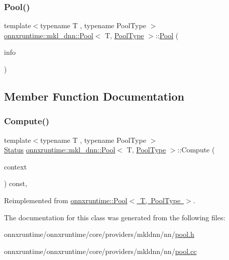 \subsubsection{\texorpdfstring{Pool()}{Pool()}}
{\footnotesize\ttfamily template$<$typename T , typename Pool\+Type $>$ \\
\mbox{\hyperlink{classonnxruntime_1_1mkl__dnn_1_1Pool}{onnxruntime\+::mkl\+\_\+dnn\+::\+Pool}}$<$ T, \mbox{\hyperlink{namespaceonnxruntime_aa4ff52f19ea8c4d3e4ce3ffbabbc7060}{Pool\+Type}} $>$\+::\mbox{\hyperlink{classonnxruntime_1_1mkl__dnn_1_1Pool}{Pool}} (\begin{DoxyParamCaption}\item[{const \mbox{\hyperlink{classonnxruntime_1_1OpKernelInfo}{Op\+Kernel\+Info}} \&}]{info }\end{DoxyParamCaption})\hspace{0.3cm}{\ttfamily [inline]}}



\subsection{Member Function Documentation}
\mbox{\label{classonnxruntime_1_1mkl__dnn_1_1Pool_aff8a05a3aec92d9e68b366ead56de08f}} 
\subsubsection{\texorpdfstring{Compute()}{Compute()}}
{\footnotesize\ttfamily template$<$typename T , typename Pool\+Type $>$ \\
\mbox{\hyperlink{classonnxruntime_1_1common_1_1Status}{Status}} \mbox{\hyperlink{classonnxruntime_1_1mkl__dnn_1_1Pool}{onnxruntime\+::mkl\+\_\+dnn\+::\+Pool}}$<$ T, \mbox{\hyperlink{namespaceonnxruntime_aa4ff52f19ea8c4d3e4ce3ffbabbc7060}{Pool\+Type}} $>$\+::Compute (\begin{DoxyParamCaption}\item[{\mbox{\hyperlink{classonnxruntime_1_1OpKernelContext}{Op\+Kernel\+Context}} $\ast$}]{context }\end{DoxyParamCaption}) const\hspace{0.3cm}{\ttfamily [override]}, {\ttfamily [virtual]}}



Reimplemented from \mbox{\hyperlink{classonnxruntime_1_1Pool_afc168d47c3d4a0a67c40bd3e14bd1431}{onnxruntime\+::\+Pool$<$ T, Pool\+Type $>$}}.



The documentation for this class was generated from the following files\+:\begin{DoxyCompactItemize}
\item 
onnxruntime/onnxruntime/core/providers/mkldnn/nn/\mbox{\hyperlink{mkldnn_2nn_2pool_8h}{pool.\+h}}\item 
onnxruntime/onnxruntime/core/providers/mkldnn/nn/\mbox{\hyperlink{mkldnn_2nn_2pool_8cc}{pool.\+cc}}\end{DoxyCompactItemize}
